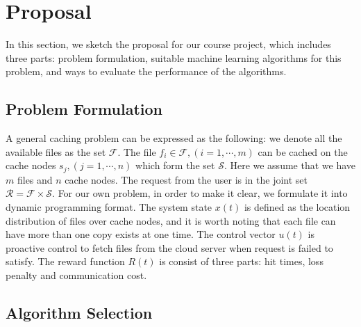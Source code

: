 \documentclass{article}
\begin{document}

\section{Proposal}

  In this section, we sketch the proposal for our course project, which includes three parts: problem formulation, suitable machine learning algorithms for this problem, and ways to evaluate the performance of the algorithms.

  \subsection{Problem Formulation}

A general caching problem can be expressed as the following: 
we denote all the available files as the set $\mathcal{F}$. The file $f_i\in\mathcal{F},(i=1,\cdots,m)$ can be cached on the cache nodes $s_j,(j=1,\cdots,n)$ which form the set $\mathcal{S}$. Here we assume that we have $m$ files and $n$ cache nodes. The request from the user is in the joint set $\mathcal{R}=\mathcal{F}\times\mathcal{S}$. For our own problem, in order to make it clear, we formulate it into dynamic programming format. The system state $x(t)$ is defined as the location distribution of files over cache nodes, and it is worth noting that each file can have more than one copy exists at one time. The control vector $u(t)$ is proactive control to fetch files from the cloud server when request is failed to satisfy. The reward function $R(t)$ is consist of three parts: hit times, loss penalty and communication cost.

  \subsection{Algorithm Selection}
\end{document}
